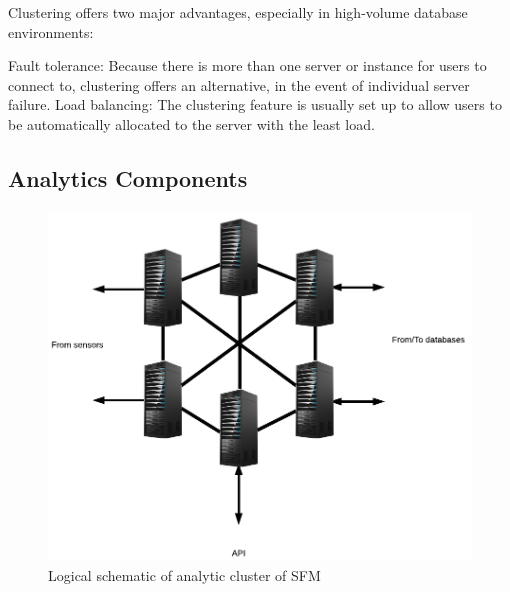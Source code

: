 Clustering offers two major advantages, especially in high-volume database environments:

Fault tolerance: Because there is more than one server or instance for users to connect to, clustering offers an alternative, in the event of individual server failure.
Load balancing: The clustering feature is usually set up to allow users to be automatically allocated to the server with the least load.


\subsection{Analytics Components}
\label{subsec:analytics}

\begin{figure}[hb!]
\centering
\includegraphics[]{6-hardware/images/analytic-cluster.png}
\caption{Logical schematic of analytic cluster of SFM}
\label{fig:analytic-cluster}
\end{figure}


